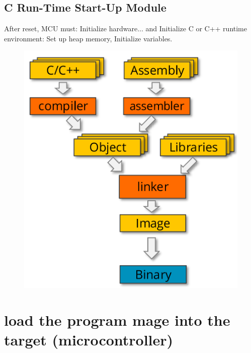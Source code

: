 \subsection{C Run-Time Start-Up Module}

 \begin{minipage}{\linewidth}
      \centering
      \begin{minipage}{0.40\linewidth}
          After reset, MCU must: Initialize hardware... and Initialize C or C++ runtime environment: Set up heap memory, Initialize variables.
      \end{minipage}
      \hspace{0.05\linewidth}
      \begin{minipage}{0.35\linewidth}
          \begin{figure}[H]
                \centering
                \includegraphics[width=1\linewidth]{img/image35.png}
          \end{figure}
      \end{minipage}
  \end{minipage}
  
\section{load the program mage into the target (microcontroller)}


